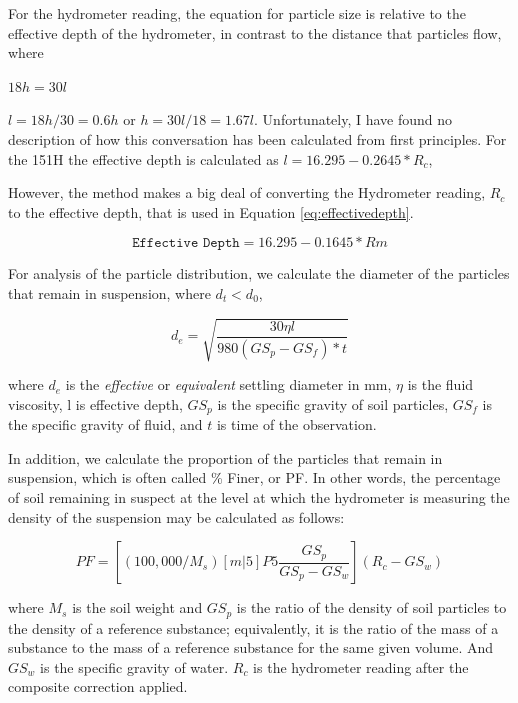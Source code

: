 \documentclass{tufte-handout}
\begin{document}
For the hydrometer reading, the equation for particle size is relative to the effective depth of the hydrometer, in contrast to the distance that particles flow, where

$18 h = 30 l$

$l = 18h/30 = 0.6h$ or $h = 30l/18 = 1.67l$. Unfortunately, I have found no description of how this conversation has been calculated from first principles. For the 151H the effective depth is calculated as $l = 16.295 - 0.2645* R_c$,

However, the method makes a big deal of converting the Hydrometer reading, $R_c$ to the effective depth, that is used in Equation \ref{eq:effectivedepth}.

\begin{equation}\label{eq:effectivedepth}
\texttt{Effective Depth} = 16.295 - 0.1645*Rm
\end{equation}

For analysis of the particle distribution, we calculate the diameter of the particles that remain in suspension, where $d_t < d_0$,  

\begin{equation}
d_e = \sqrt{\frac{30 \eta l}{980 (GS_p - GS_f)* t}}
\end{equation}

\noindent where $d_e$ is the \emph{effective} or \emph{equivalent} settling diameter in mm, 
$\eta$ is the fluid viscosity,
l is effective depth,
$GS_p$ is the specific gravity of soil particles,
$GS_f$ is the specific gravity of fluid, and
$t$ is time of the observation.

In addition, we calculate the proportion of the particles that remain in suspension, which is often called \% Finer, or PF. In other words, the percentage of soil remaining in suspect at the level at which the hydrometer is measuring the density of the suspension may be calculated as follows:

\begin{equation}
PF = [(100,000/M_s)[m|5]P5 \frac{GS_p}{GS_p - GS_w}](R_c - GS_w)
\end{equation}

\noindent where $M_s$ is the soil weight and $GS_p$ is the ratio of the density of soil particles to the density of a reference substance; equivalently, it is the ratio of the mass of a substance to the mass of a reference substance for the same given volume. And $GS_w$ is the specific gravity of water. $R_c$ is the hydrometer reading after the composite correction applied.
\end{document}
